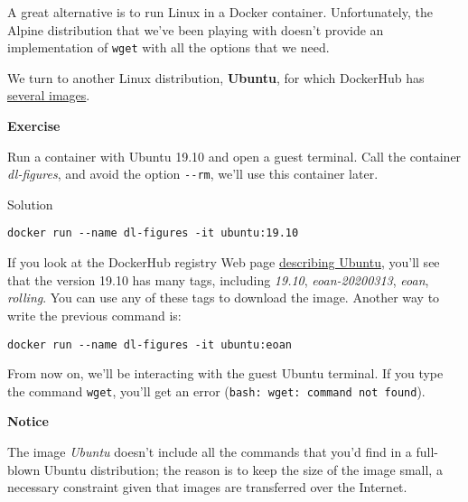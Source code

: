 \documentclass[
]{article}
\newenvironment{infobox}[1]
  {
  \begin{itemize}
  \renewcommand{\labelitemi}{
    \raisebox{-.7\height}[0pt][0pt]{
      
    }
  }
  \setlength{\fboxsep}{1em}
  \begin{whitebox}
  \item
  }
  {
  \end{whitebox}
  \end{itemize}
  }
\theoremstyle{definition}
\theoremstyle{definition}
\theoremstyle{definition}
\theoremstyle{remark}
\let\BeginKnitrBlock\begin \let\EndKnitrBlock\end
\begin{document}
A great alternative is to run Linux in a Docker container.
Unfortunately, the Alpine distribution that we've been playing
with doesn't provide
an implementation of \texttt{wget} with all the options that we need.

We turn to another Linux distribution, \textbf{Ubuntu},
for which DockerHub has
\href{https://hub.docker.com/_/ubuntu/}{several images}.

\begin{infobox}{exercisebox}

\textbf{Exercise}

\BeginKnitrBlock{exercise}
\protect\hypertarget{exr:unnamed-chunk-11}{}{\label{exr:unnamed-chunk-11} }Run a container with Ubuntu 19.10 and open a guest terminal.
Call the container \emph{dl-figures}, and avoid the option
\texttt{-\/-rm}, we'll use this container later.
\EndKnitrBlock{exercise}

\end{infobox}

Solution

\begin{infobox}{exercisebox}

\begin{verbatim}
docker run --name dl-figures -it ubuntu:19.10
\end{verbatim}

If you look at the DockerHub registry Web page
\href{https://hub.docker.com/_/ubuntu/}{describing Ubuntu},
you'll see that the version 19.10 has many tags, including \emph{19.10},
\emph{eoan-20200313}, \emph{eoan}, \emph{rolling}.
You can use any of these tags to download the image.
Another way to write the previous command is:

\begin{verbatim}
docker run --name dl-figures -it ubuntu:eoan
\end{verbatim}

\end{infobox}

From now on, we'll be interacting with the guest Ubuntu terminal.
If you type the command \texttt{wget},
you'll get an error (\texttt{bash:\ wget:\ command\ not\ found}).

\begin{infobox}{warning}

\textbf{Notice}

The image \emph{Ubuntu} doesn't include all the commands that you'd find
in a full-blown Ubuntu distribution;
the reason is to keep the size of the image small,
a necessary constraint given that
images are transferred over the Internet.

\end{infobox}
\end{document}
